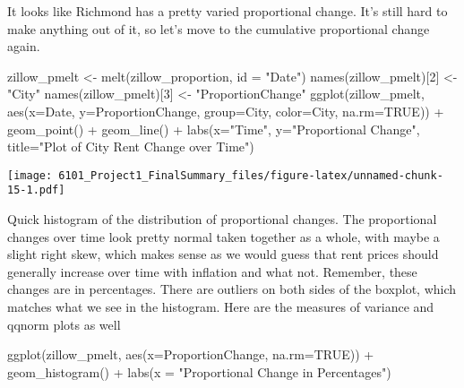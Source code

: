 \documentclass[
]{article}
\newenvironment{Shaded}{\begin{snugshade}}{\end{snugshade}}
\newcommand{\AttributeTok}[1]{\textcolor[rgb]{0.77,0.63,0.00}{#1}}
\newcommand{\ConstantTok}[1]{\textcolor[rgb]{0.00,0.00,0.00}{#1}}
\newcommand{\DecValTok}[1]{\textcolor[rgb]{0.00,0.00,0.81}{#1}}
\newcommand{\FunctionTok}[1]{\textcolor[rgb]{0.00,0.00,0.00}{#1}}
\newcommand{\NormalTok}[1]{#1}
\newcommand{\OtherTok}[1]{\textcolor[rgb]{0.56,0.35,0.01}{#1}}
\newcommand{\SpecialCharTok}[1]{\textcolor[rgb]{0.00,0.00,0.00}{#1}}
\newcommand{\StringTok}[1]{\textcolor[rgb]{0.31,0.60,0.02}{#1}}
\begin{document}
It looks like Richmond has a pretty varied proportional change. It's
still hard to make anything out of it, so let's move to the cumulative
proportional change again.

\begin{Shaded}
\begin{Highlighting}[]
\NormalTok{zillow\_pmelt }\OtherTok{\textless{}{-}} \FunctionTok{melt}\NormalTok{(zillow\_proportion, }\AttributeTok{id =} \StringTok{"Date"}\NormalTok{)}
\FunctionTok{names}\NormalTok{(zillow\_pmelt)[}\DecValTok{2}\NormalTok{] }\OtherTok{\textless{}{-}} \StringTok{"City"}
\FunctionTok{names}\NormalTok{(zillow\_pmelt)[}\DecValTok{3}\NormalTok{] }\OtherTok{\textless{}{-}} \StringTok{"ProportionChange"}
\FunctionTok{ggplot}\NormalTok{(zillow\_pmelt, }\FunctionTok{aes}\NormalTok{(}\AttributeTok{x=}\NormalTok{Date, }\AttributeTok{y=}\NormalTok{ProportionChange, }\AttributeTok{group=}\NormalTok{City, }\AttributeTok{color=}\NormalTok{City, }\AttributeTok{na.rm=}\ConstantTok{TRUE}\NormalTok{)) }\SpecialCharTok{+} \FunctionTok{geom\_point}\NormalTok{() }\SpecialCharTok{+} \FunctionTok{geom\_line}\NormalTok{() }\SpecialCharTok{+} \FunctionTok{labs}\NormalTok{(}\AttributeTok{x=}\StringTok{"Time"}\NormalTok{, }\AttributeTok{y=}\StringTok{"Proportional Change"}\NormalTok{, }\AttributeTok{title=}\StringTok{"Plot of City Rent Change over Time"}\NormalTok{)}
\end{Highlighting}
\end{Shaded}

\texttt{[image: 6101\_Project1\_FinalSummary\_files/figure-latex/unnamed-chunk-15-1.pdf]}

Quick histogram of the distribution of proportional changes. The
proportional changes over time look pretty normal taken together as a
whole, with maybe a slight right skew, which makes sense as we would
guess that rent prices should generally increase over time with
inflation and what not. Remember, these changes are in percentages.
There are outliers on both sides of the boxplot, which matches what we
see in the histogram. Here are the measures of variance and qqnorm plots
as well

\begin{Shaded}
\begin{Highlighting}[]
\FunctionTok{ggplot}\NormalTok{(zillow\_pmelt, }\FunctionTok{aes}\NormalTok{(}\AttributeTok{x=}\NormalTok{ProportionChange, }\AttributeTok{na.rm=}\ConstantTok{TRUE}\NormalTok{)) }\SpecialCharTok{+} \FunctionTok{geom\_histogram}\NormalTok{() }\SpecialCharTok{+} \FunctionTok{labs}\NormalTok{(}\AttributeTok{x =} \StringTok{"Proportional Change in Percentages"}\NormalTok{)}
\end{Highlighting}
\end{Shaded}
\end{document}
